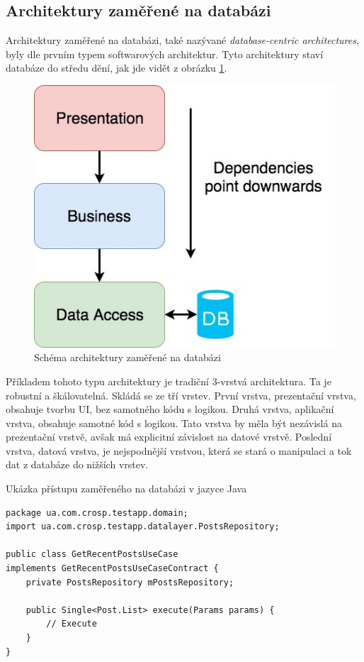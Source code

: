 \subsection{Architektury zaměřené na databázi}

Architektury zaměřené na databázi,
také nazývané \emph{database-centric architectures},
byly dle \cite{architecture} prvním typem softwarových architektur.
Tyto architektury staví databáze do středu dění,
jak jde vidět z obrázku \ref{fig:architecture_database}.

\begin{figure}
    \centering
    \includegraphics[width=0.5\linewidth]{assets/technology-research/architecture/database-centric.jpg}
    \caption{Schéma architektury zaměřené na databázi  \cite{architecture}}
    \label{fig:architecture_database}
\end{figure}

Příkladem tohoto typu architektury je tradiční 3-vrstvá architektura.
Ta je robustní a škálovatelná.
Skládá se ze tří vrstev.
První vrstva,
prezentační vrstva,
obsahuje tvorbu UI,
bez samotného kódu s logikou.
Druhá vrstva,
aplikační vrstva,
obsahuje samotné kód s logikou.
Tato vrstva by měla být nezávislá na prezentační vrstvě,
avšak má explicitní závislost na datové vrstvě.
Poslední vrstva,
datová vrstva,
je nejspodnější vrstvou,
která se stará o manipulaci a tok dat z databáze do nižších vrstev.
\cite{architecture}

\begin{listing}
    \caption{Ukázka přístupu zaměřeného na databázi v jazyce Java \cite{architecture}}
    \label{code:architecture-database}
    \begin{verbatim}
package ua.com.crosp.testapp.domain;
import ua.com.crosp.testapp.datalayer.PostsRepository;

public class GetRecentPostsUseCase
implements GetRecentPostsUseCaseContract {
    private PostsRepository mPostsRepository;

    public Single<Post.List> execute(Params params) {
        // Execute
    }
}
    \end{verbatim}
\end{listing}

